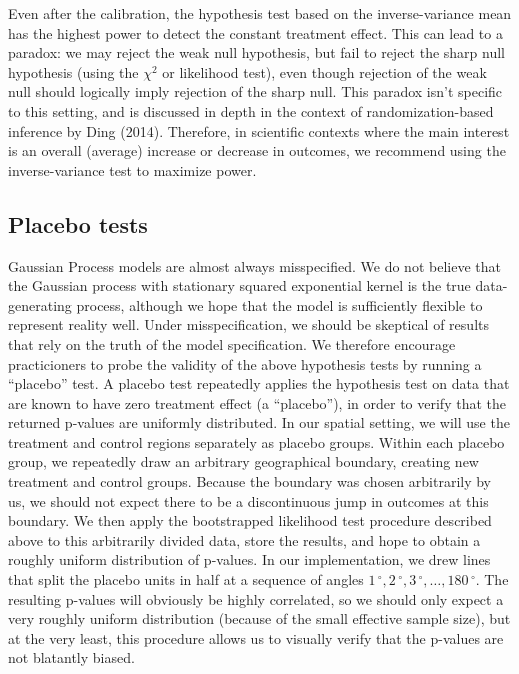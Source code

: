 \documentclass[letter]{article}
\newcommand{\degree}{{\,^\circ}}
\begin{document}
Even after the calibration, the hypothesis test based on the
inverse-variance mean has the highest power to detect the constant
treatment effect. This can lead to a paradox: we may reject the weak
null hypothesis, but fail to reject the sharp null hypothesis (using the
\(\chi^2\) or likelihood test), even though rejection of the weak null
should logically imply rejection of the sharp null. This paradox isn't
specific to this setting, and is discussed in depth in the context of
randomization-based inference by Ding (2014). Therefore, in scientific
contexts where the main interest is an overall (average) increase or
decrease in outcomes, we recommend using the inverse-variance test to
maximize power.
    


    	\subsection{Placebo tests}\label{placebo-tests}
    

\label{sec:placebo}
    	Gaussian Process models are almost always misspecified. We do not
believe that the Gaussian process with stationary squared exponential
kernel is the true data-generating process, although we hope that the
model is sufficiently flexible to represent reality well. Under
misspecification, we should be skeptical of results that rely on the
truth of the model specification. We therefore encourage practicioners
to probe the validity of the above hypothesis tests by running a
``placebo'' test. A placebo test repeatedly applies the hypothesis test
on data that are known to have zero treatment effect (a ``placebo''), in
order to verify that the returned p-values are uniformly distributed. In
our spatial setting, we will use the treatment and control regions
separately as placebo groups. Within each placebo group, we repeatedly
draw an arbitrary geographical boundary, creating new treatment and
control groups. Because the boundary was chosen arbitrarily by us, we
should not expect there to be a discontinuous jump in outcomes at this
boundary. We then apply the bootstrapped likelihood test procedure
described above to this arbitrarily divided data, store the results, and
hope to obtain a roughly uniform distribution of p-values. In our
implementation, we drew lines that split the placebo units in half at a
sequence of angles \(1\degree,2\degree,3\degree,\ldots,180\degree\). The
resulting p-values will obviously be highly correlated, so we should
only expect a very roughly uniform distribution (because of the small
effective sample size), but at the very least, this procedure allows us
to visually verify that the p-values are not blatantly biased.
    
\end{document}
